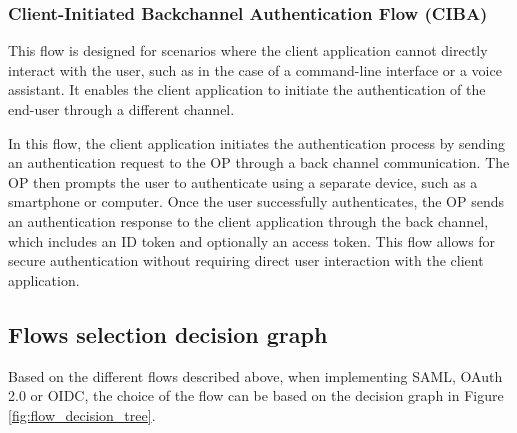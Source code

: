 \documentclass[../memoire.tex]{subfiles}
\begin{document}
\subsubsection*{Client-Initiated Backchannel Authentication Flow (CIBA)}


This flow is designed for scenarios where the client application cannot directly interact with the user, such as in the case of a command-line interface or a voice assistant. It enables the client application to initiate the authentication of the end-user through a different channel.


In this flow, the client application initiates the authentication process by sending an authentication request to the OP through a back channel communication. The OP then prompts the user to authenticate using a separate device, such as a smartphone or computer. Once the user successfully authenticates, the OP sends an authentication response to the client application through the back channel, which includes an ID token and optionally an access token. This flow allows for secure authentication without requiring direct user interaction with the client application.

\subsection{Flows selection decision graph}

Based on the different flows described above, when implementing SAML, OAuth 2.0 or OIDC, the choice of the flow can be based on the decision graph in Figure \ref{fig:flow_decision_tree}. 
\end{document}
